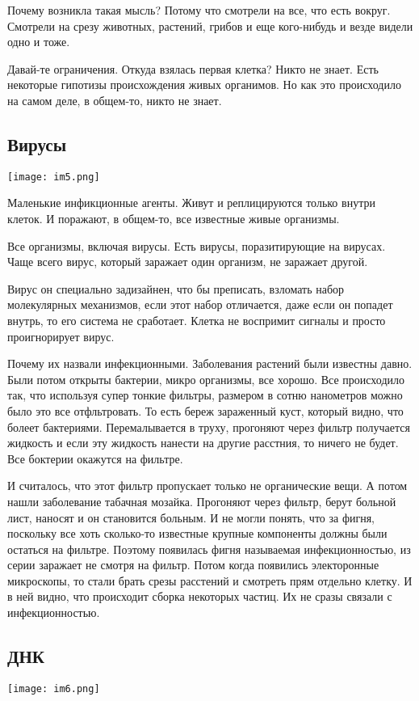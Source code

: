 Почему возникла такая мысль? Потому что 
смотрели на все, что есть вокруг. 
Смотрели на срезу животных, растений, 
грибов и еще кого-нибудь и везде видели одно и тоже. 

Давай-те ограничения. Откуда взялась первая клетка? Никто 
не знает. Есть некоторые гипотизы происхождения живых органимов. 
Но как это происходило на самом деле, в общем-то, никто не знает. 

\subsection{Вирусы}
\texttt{[image: im5.png]}

Маленькие инфикционные агенты. Живут и реплицируются только 
внутри клеток. И поражают, в общем-то, все известные живые 
организмы. 


Все организмы, включая вирусы. Есть вирусы, поразитирующие на вирусах.
Чаще всего вирус, который заражает один организм, не заражает другой. 

Вирус он специально задизайнен, что бы преписать, взломать набор 
молекулярных механизмов, если этот набор отличается, даже если 
он попадет внутрь, то его система не сработает. Клетка не воспримит 
сигналы и просто проигнорирует вирус. 

Почему их назвали инфекционными. Заболевания растений были известны 
давно. Были потом открыты бактерии, микро организмы, все хорошо. Все происходило 
так, что используя супер тонкие фильтры, 
размером в сотню нанометров можно было это все отфльтровать. 
То есть береж зараженный куст, 
который видно, что болеет бактериями. Перемалывается в труху, 
прогоняют через фильтр получается жидкость и если 
эту жидкость нанести на другие расстния, то 
ничего не будет. Все боктерии окажутся на фильтре. 

И считалось, что этот фильтр пропускает только не органические вещи. А
потом нашли заболевание табачная мозайка. Прогоняют через фильтр, 
берут больной лист, наносят и он становится больным. И не могли понять, 
что за фигня, поскольку все хоть сколько-то известные крупные компоненты должны 
были остаться на фильтре. Поэтому появилась фигня называемая инфекционностью, 
из серии заражает не смотря на фильтр. Потом когда появились 
электоронные микроскопы, то стали брать срезы расстений и 
смотреть прям отдельно клетку. И в ней видно, что 
происходит сборка некоторых частиц. Их не сразы связали с инфекционностью. 

\subsection{ДНК}
\texttt{[image: im6.png]}

